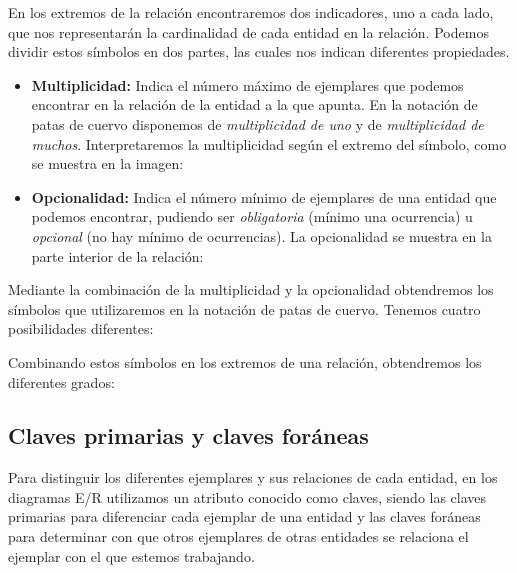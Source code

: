 En los extremos de la relación encontraremos dos indicadores, uno a cada lado, que nos representarán la cardinalidad de cada entidad en la relación. Podemos dividir estos símbolos en dos partes, las cuales nos indican diferentes propiedades.
\begin{itemize}
    \item \textbf{Multiplicidad: } Indica el número máximo de ejemplares que podemos encontrar en la relación de la entidad a la que apunta. En la notación de patas de cuervo disponemos de \emph{multiplicidad de uno} y de \emph{multiplicidad de muchos}. Interpretaremos la multiplicidad según el extremo del símbolo, como se muestra en la imagen:
    
    \item \textbf{Opcionalidad: }Indica el número mínimo de ejemplares de una entidad que podemos encontrar, pudiendo ser \emph{obligatoria} (mínimo una ocurrencia) u \emph{opcional} (no hay mínimo de ocurrencias). La opcionalidad se muestra en la parte interior de la relación:
\end{itemize}

Mediante la combinación de la multiplicidad y la opcionalidad obtendremos los símbolos que utilizaremos en la notación de patas de cuervo. Tenemos cuatro posibilidades diferentes:

Combinando estos símbolos en los extremos de una relación, obtendremos los diferentes grados:

\subsection{Claves primarias y claves foráneas}
Para distinguir los diferentes ejemplares y sus relaciones de cada entidad, en los diagramas E/R utilizamos un atributo conocido como claves, siendo las claves primarias para diferenciar cada ejemplar de una entidad y las claves foráneas para determinar con que otros ejemplares de otras entidades se relaciona el ejemplar con el que estemos trabajando.

